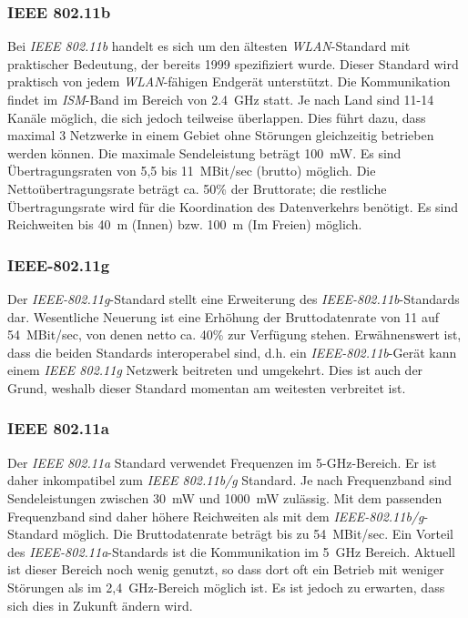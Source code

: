         \subsubsection{IEEE 802.11b}
            Bei \emph{IEEE 802.11b} handelt es sich um den ältesten \emph{WLAN}-Standard mit praktischer
            Bedeutung, der bereits 1999 spezifiziert wurde. Dieser Standard wird praktisch von jedem 
            \emph{WLAN}-fähigen 
            Endgerät unterstützt. Die Kommunikation findet im \emph{ISM}-Band im Bereich von 2.4~GHz
            statt. Je nach Land sind 11-14 Kanäle möglich, die sich jedoch teilweise überlappen.
            Dies führt dazu, dass maximal 3 Netzwerke in einem Gebiet ohne Störungen gleichzeitig betrieben werden
            können. Die maximale Sendeleistung beträgt 100~mW. Es sind Übertragungsraten von 
            5,5 bis 11~MBit/sec (brutto) möglich. Die Nettoübertragungsrate beträgt ca. 50\% der
            Bruttorate; die restliche Übertragungsrate wird für die Koordination des Datenverkehrs
            benötigt. Es sind Reichweiten bis 40~m (Innen) bzw. 100~m (Im Freien) möglich\cite{WirelessNetworking}.

        \subsubsection{IEEE-802.11g}
            Der \emph{IEEE-802.11g}-Standard stellt eine Erweiterung des \emph{IEEE-802.11b}-Standards dar.
            Wesentliche Neuerung ist eine Erhöhung der Bruttodatenrate von 11 auf 54~MBit/sec,
            von denen netto ca. 40\% zur Verfügung stehen. Erwähnenswert ist, dass die
            beiden Standards interoperabel sind, d.h. ein \emph{IEEE-802.11b}-Gerät kann einem
            \emph{IEEE 802.11g} Netzwerk beitreten und umgekehrt. Dies ist auch der Grund, weshalb
            dieser Standard momentan am weitesten verbreitet ist.

        \subsubsection{IEEE 802.11a}
            Der \emph{IEEE 802.11a} Standard verwendet Frequenzen im 5-GHz-Bereich. Er ist daher
            inkompatibel zum \emph{IEEE 802.11b/g} Standard. Je nach Frequenzband sind 
            Sendeleistungen zwischen 30~mW und 1000~mW zulässig. Mit dem passenden Frequenzband
            sind daher höhere Reichweiten als mit dem \emph{IEEE-802.11b/g}-Standard möglich.
            Die Bruttodatenrate beträgt bis zu 54~MBit/sec. 
            Ein Vorteil des \emph{IEEE-802.11a}-Standards ist die Kommunikation im 5~GHz Bereich.
            Aktuell ist dieser Bereich noch wenig genutzt, so dass dort
            oft ein Betrieb mit weniger Störungen als im 2,4~GHz-Bereich möglich ist.
            Es ist jedoch zu erwarten, dass sich dies in Zukunft ändern wird.

